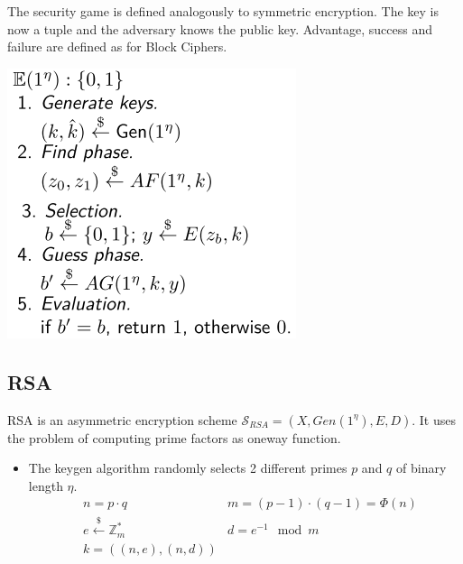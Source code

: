 \begin{minipage}{.45\linewidth}
The security game is defined analogously to symmetric encryption. The key is now a tuple and the adversary knows the public key. Advantage, success and failure are defined as for Block Ciphers.
\end{minipage}\hfill
\begin{minipage}{.45\linewidth}
\includegraphics[width=\linewidth]{img/acpa}
\end{minipage}

\hypertarget{rsa}{%
\subsection{RSA}\label{rsa}}

RSA is an asymmetric encryption scheme
\(\mathcal{S}_{RSA} = (X, Gen(1^\eta), E, D)\). It uses the problem of
computing prime factors as oneway function.

\begin{itemize}
\tightlist
\item
  The keygen algorithm randomly selects 2 different primes \(p\) and
  \(q\) of binary length \(\eta\). \begin{alignat*}
  &n = p \cdot q
  &m = (p-1) \cdot (q-1) = \Phi(n)\\
  &e \overset{\$}{\leftarrow}\mathbb{Z}_m^*
  &d = e^{-1} \mod m\\
  &k = ((n,e), (n,d))
  \end{alignat*}
\end{itemize}
